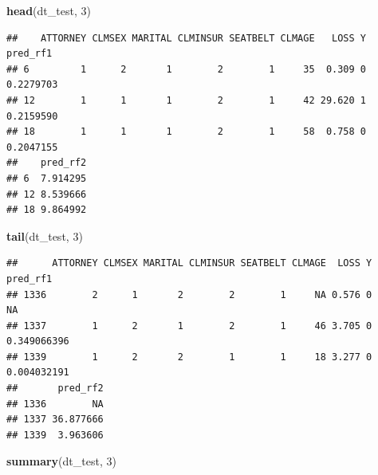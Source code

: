 \documentclass[]{book}
\newenvironment{Shaded}{\begin{snugshade}}{\end{snugshade}}
\newcommand{\DecValTok}[1]{\textcolor[rgb]{0.00,0.00,0.81}{#1}}
\newcommand{\KeywordTok}[1]{\textcolor[rgb]{0.13,0.29,0.53}{\textbf{#1}}}
\newcommand{\NormalTok}[1]{#1}
\begin{document}
\begin{Shaded}
\begin{Highlighting}[]
\KeywordTok{head}\NormalTok{(dt_test, }\DecValTok{3}\NormalTok{)}
\end{Highlighting}
\end{Shaded}

\begin{verbatim}
##    ATTORNEY CLMSEX MARITAL CLMINSUR SEATBELT CLMAGE   LOSS Y  pred_rf1
## 6         1      2       1        2        1     35  0.309 0 0.2279703
## 12        1      1       1        2        1     42 29.620 1 0.2159590
## 18        1      1       1        2        1     58  0.758 0 0.2047155
##    pred_rf2
## 6  7.914295
## 12 8.539666
## 18 9.864992
\end{verbatim}

\begin{Shaded}
\begin{Highlighting}[]
\KeywordTok{tail}\NormalTok{(dt_test, }\DecValTok{3}\NormalTok{)}
\end{Highlighting}
\end{Shaded}

\begin{verbatim}
##      ATTORNEY CLMSEX MARITAL CLMINSUR SEATBELT CLMAGE  LOSS Y    pred_rf1
## 1336        2      1       2        2        1     NA 0.576 0          NA
## 1337        1      2       1        2        1     46 3.705 0 0.349066396
## 1339        1      2       2        1        1     18 3.277 0 0.004032191
##       pred_rf2
## 1336        NA
## 1337 36.877666
## 1339  3.963606
\end{verbatim}

\begin{Shaded}
\begin{Highlighting}[]
\KeywordTok{summary}\NormalTok{(dt_test, }\DecValTok{3}\NormalTok{)}
\end{Highlighting}
\end{Shaded}
\end{document}
